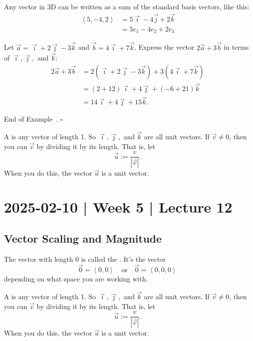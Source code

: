 \documentclass[10pt]{article}
\theoremstyle{definition}
\newtheorem{example}[theorem]{Example}
\renewenvironment{example}
{\begin{oldexample}}
  {\par\smallskip\hfill   End of Example~\theexample. $\square$    \par\end{oldexample}}
\newcommand{\1}[1]{\textbf{1}_{\left[#1\right]}} %
\newcommand{\dempfcolor}[1]{{\color{RoyalBlue}#1}}
\newcommand{\demph}[1]{\dempfcolor{{\sl #1}}}
\begin{document}
Any vector in 3D can be written as a sum of the standard basis vectors, like this:
\begin{align*}
  \left\langle 5,-4,2 \right\rangle 
  &= 5 \vec{\imath} -4 \vec{j} + 2 \vec{k}\\
  &= 5 e_{1} -4 e_{2} + 2 e_{3}
\end{align*}


\begin{example}
  Let $\vec{a} = \vec{\imath}+2\vec{\jmath}-3\vec{k}$ and $\vec{b} = 4\vec{\imath}+7\vec{k}$. Express the
  vector $2\vec{a}+3\vec{b}$ in terms of $\vec{\imath},\vec{\jmath},$ and $\vec{k}$:
  \begin{align*}
    2\vec{a}+3\vec{b}
    &=2 \left(\vec{\imath}+2\vec{\jmath}-3\vec{k}  \right)
      + 3 \left( 4\vec{\imath}+7\vec{k} \right)\\ 
    &= (2+12)\vec{\imath} + 4 \vec{\jmath} + (-6+21)\vec{k}\\
    &= 14 \vec{\imath} + 4 \vec{\jmath} + 15 \vec{k}.
  \end{align*}
\end{example}


A \demph{unit vector} is any vector of length 1. So $\vec{\imath},\vec{\jmath},$ and $\vec{k}$ are all
unit vectors. If $\vec{v}\neq 0$, then you can \demph{normalize} $\vec{v}$ by dividing it by its
length. That is, let
\begin{equation*}
  \vec{u} := \frac{v}{|\vec{v}|}.
\end{equation*}
When you do this, the vector $\vec{u}$ is a unit vector.



\newpage
\section{2025-02-10 | Week 5 | Lecture 12}

\subsection{Vector Scaling and Magnitude}
The vector with length $0$ is called the \demph{zero vector}. It's the vector
\begin{equation*}
  \vec{0} = \left\langle 0,0 \right\rangle
  \quad \text{or} \quad
  \vec{0} = \left\langle 0,0,0 \right\rangle 
\end{equation*}
depending on what space you are working with.


A \demph{unit vector} is any vector of length 1. So $\vec{\imath},\vec{\jmath},$ and $\vec{k}$ are all
unit vectors. If $\vec{v}\neq 0$, then you can \demph{normalize} $\vec{v}$ by dividing it by its
length. That is, let
\begin{equation*}
  \vec{u} := \frac{v}{|\vec{v}|}.
\end{equation*}
When you do this, the vector $\vec{u}$ is a unit vector.
\end{document}
